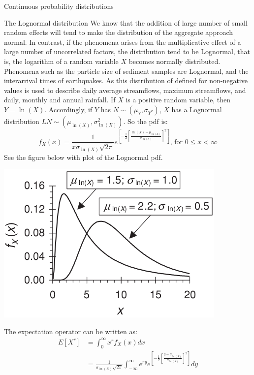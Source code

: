 \documentclass[8pt]{beamer}
\renewcommand{\emph}[1]{\textcolor{myorange}{#1}}
\begin{document}
\begin{frame}{Continuous probability distributions} 
    \begin{block}{The \alert{Lognormal} distribution}
        We know that the addition of large number of small random effects will tend to make the distribution of the aggregate approach normal. In contrast, if the phenomena arises from the multiplicative effect of a large number of uncorrelated factors, the distribution tend to be \alert{Lognormal}, that is, the logarithm of a random variable $X$ becomes normally distributed. Phenomena such as the particle size of sediment samples are \emph{Lognormal}, and the interarrival times of earthquakes. As this distribution of defined for non-negative values is used to describe daily average streamflows, maximum streamflows, and daily, monthly and annual rainfall. If $X$ is a positive random variable, then $Y = \ln (X)$. Accordingly, if $Y$ has $N \sim (\mu_Y , \sigma_{Y^2})$, $X$ has a \emph{Lognormal distribution} $LN \sim (\mu_{\ln(X)}, \sigma_{\ln(X)}^2)$. So the \emph{pdf} is:
        \[
            f_X (x) = \frac{1}{x \sigma_{\ln (X)} \sqrt{2\pi}} e^{\left[ -\frac{1}{2} \left[ \frac{\ln (X) -\mu_{\ln (X)}}{\sigma_{\ln (X)}} \right]^2 \right]}, \, \text{for } 0 \leq x < \infty
            \]
            See the figure below with plot of the \emph{Lognormal pdf}.
   \end{block}

\begin{minipage}{0.37\textwidth}
\centering
\includegraphics[width=0.95\linewidth]{fi4210.png}  %
\end{minipage}
\hfill
\begin{minipage}{0.59\textwidth}
    The expectation operator can be written as: 
    \begin{align*}
        E\left[X^r \right] &= \int_0^{\infty} x^r f_X (x) dx  \\
        &= \frac{1}{\sigma_{\ln (X)} \sqrt{2\pi}} \int_{-\infty}^{\infty} e^{ry} e^{\left[ -\frac{1}{2} \left[ \frac{ y-\mu_{\ln (X)}}{\sigma_{\ln (X)}} \right]^2 \right]} dy
    \end{align*}
\end{minipage}
                
\end{frame}
\end{document}
